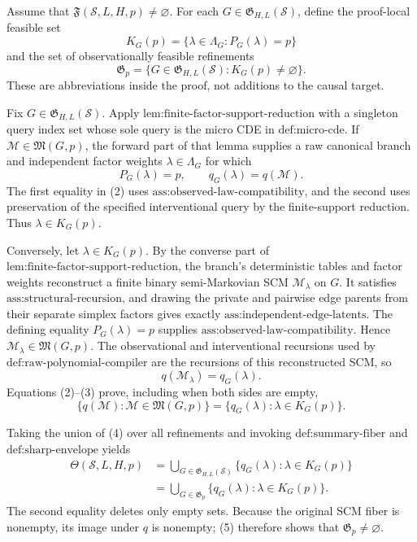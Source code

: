 Assume that \(\mathfrak F(\mathcal S,L,H,p)\ne\varnothing\).  For each \(G\in\mathfrak G_{H,L}(\mathcal S)\), define the proof-local feasible set
\[
K_G(p)=\{\lambda\in\Lambda_G:P_G(\lambda)=p\}
\]
and the set of observationally feasible refinements
\[
\mathfrak G_p=\{G\in\mathfrak G_{H,L}(\mathcal S):K_G(p)\ne\varnothing\}.
\tag{1}
\]
These are abbreviations inside the proof, not additions to the causal target.

Fix \(G\in\mathfrak G_{H,L}(\mathcal S)\).  Apply \(\text{lem:finite-factor-support-reduction}\) with a singleton query index set whose sole query is the micro CDE in \(\text{def:micro-cde}\).  If \(\mathcal M\in\mathfrak M(G,p)\), the forward part of that lemma supplies a raw canonical branch and independent factor weights \(\lambda\in\Lambda_G\) for which
\[
P_G(\lambda)=p,
\qquad
q_G(\lambda)=q(\mathcal M).
\tag{2}
\]
The first equality in (2) uses \(\text{ass:observed-law-compatibility}\), and the second uses preservation of the specified interventional query by the finite-support reduction.  Thus \(\lambda\in K_G(p)\).

Conversely, let \(\lambda\in K_G(p)\).  By the converse part of \(\text{lem:finite-factor-support-reduction}\), the branch's deterministic tables and factor weights reconstruct a finite binary semi-Markovian SCM \(\mathcal M_\lambda\) on \(G\).  It satisfies \(\text{ass:structural-recursion}\), and drawing the private and pairwise edge parents from their separate simplex factors gives exactly \(\text{ass:independent-edge-latents}\).  The defining equality \(P_G(\lambda)=p\) supplies \(\text{ass:observed-law-compatibility}\).  Hence \(\mathcal M_\lambda\in\mathfrak M(G,p)\).  The observational and interventional recursions used by \(\text{def:raw-polynomial-compiler}\) are the recursions of this reconstructed SCM, so
\[
q(\mathcal M_\lambda)=q_G(\lambda).
\tag{3}
\]
Equations (2)--(3) prove, including when both sides are empty,
\[
\{q(\mathcal M):\mathcal M\in\mathfrak M(G,p)\}
=\{q_G(\lambda):\lambda\in K_G(p)\}.
\tag{4}
\]

Taking the union of (4) over all refinements and invoking \(\text{def:summary-fiber}\) and \(\text{def:sharp-envelope}\) yields
\[
\begin{aligned}
\Theta(\mathcal S,L,H,p)
&=\bigcup_{G\in\mathfrak G_{H,L}(\mathcal S)}
  \{q_G(\lambda):\lambda\in K_G(p)\}\\
&=\bigcup_{G\in\mathfrak G_p}
  \{q_G(\lambda):\lambda\in K_G(p)\}.
\end{aligned}
\tag{5}
\]
The second equality deletes only empty sets.  Because the original SCM fiber is nonempty, its image under \(q\) is nonempty; (5) therefore shows that \(\mathfrak G_p\ne\varnothing\).

